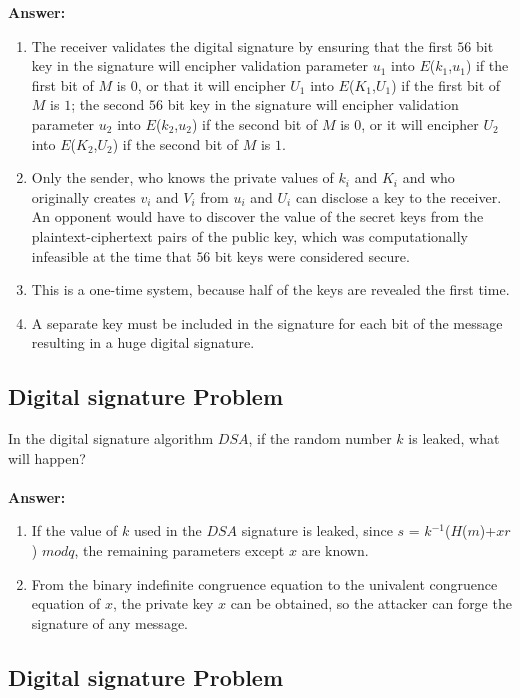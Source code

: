 \documentclass[paper=a4, fontsize=11pt]{scrartcl} %
\numberwithin{equation}{section} %
\numberwithin{figure}{section} %
\numberwithin{table}{section} %
\begin{document}
\textbf{Answer:}
\begin{enumerate}
\item The receiver validates the digital signature by ensuring that the first $56$ bit key in the signature will encipher validation parameter $u$$_1$ into $E$($k$$_1$,$u$$_1$) if the first bit of $M$ is $0$, or that it will encipher $U$$_1$ into $E$($K$$_1$,$U$$_1$) if the first bit of $M$ is $1$; the second $56$ bit key in the signature will encipher validation parameter $u$$_2$ into $E$($k$$_2$,$u$$_2$) if the second bit of $M$ is $0$, or it will encipher $U$$_2$ into $E$($K$$_2$,$U$$_2$) if the second bit of $M$ is $1$.
\item Only the sender, who knows the private values of $k$$_i$ and $K$$_i$ and who originally creates $v$$_i$ and $V$$_i$ from $u$$_i$ and $U$$_i$ can disclose a key to the receiver. An opponent would have to discover the value of the secret keys from the plaintext-ciphertext pairs of the public key, which was computationally infeasible at the time that $56$ bit keys were considered secure.
\item This is a one-time system, because half of the keys are revealed the first time.
\item A separate key must be included in the signature for each bit of the message resulting in a huge digital signature.
\end{enumerate}


\subsection{Digital signature Problem \uppercase\expandafter{}}

In the digital signature algorithm $DSA$, if the random number $k$ is leaked, what will happen?
\\
\\
\textbf{Answer:}
\begin{enumerate}
\item If the value of $k$ used in the $DSA$ signature is leaked, since $s$ = $k$$^{-1}$($H$($m$)+$xr$) $mod q$, the remaining parameters except $x$ are known.
\item From the binary indefinite congruence equation to the univalent congruence equation of $x$, the private key $x$ can be obtained, so the attacker can forge the signature of any message.
\end{enumerate}


\subsection{Digital signature Problem \uppercase\expandafter{}}
\end{document}
